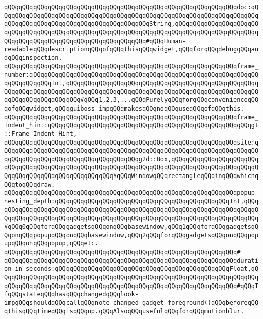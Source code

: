 \verb|qQQqqQQqqQQqqQQqqQQqqQQqqQQqqQQqqQQqqQQqqQQqqQQqqQQqqQQqqQQqqQQqdoc:qQQqqQQqqQQqqQQqqQQqqQQqqQQqqQQqqQQqqQQqqQQqqQQqqQQqqQQqqQQqqQQqqQQqqQQqqQQqqQQqqQQqqQQqqQQqqQQqqQQqqQQqqQQqqQQqString,qQQqqQQqqQQqqQQqqQQqqQQqqQQqqQQqqQQqqQQqqQQqqQQqqQQqqQQqqQQqqQQqqQQqqQQqqQQqqQQqqQQqqQQqqQQqqQQqqQQqqQQqqQQqqQQqqQQqqQQqqQQqqQQqqQQq#qQQqHuman-readableqQQqdescriptionqQQqofqQQqthisqQQqwidget,qQQqforqQQqdebugqQQqandqQQqinspection.|\newline
\verb|qQQqqQQqqQQqqQQqqQQqqQQqqQQqqQQqqQQqqQQqqQQqqQQqqQQqqQQqqQQqqQQqframe_number:qQQqqQQqqQQqqQQqqQQqqQQqqQQqqQQqqQQqqQQqqQQqqQQqqQQqqQQqqQQqqQQqqQQqqQQqqQQqInt,qQQqqQQqqQQqqQQqqQQqqQQqqQQqqQQqqQQqqQQqqQQqqQQqqQQqqQQqqQQqqQQqqQQqqQQqqQQqqQQqqQQqqQQqqQQqqQQqqQQqqQQqqQQqqQQqqQQqqQQqqQQqqQQqqQQqqQQqqQQqqQQq#qQQq1,2,3,...qQQqPurelyqQQqforqQQqconvenienceqQQqofqQQqwidget,qQQqguiboss-impqQQqmakesqQQqnoqQQquseqQQqofqQQqthis.|\newline
\verb|qQQqqQQqqQQqqQQqqQQqqQQqqQQqqQQqqQQqqQQqqQQqqQQqqQQqqQQqqQQqqQQqframe_indent_hint:qQQqqQQqqQQqqQQqqQQqqQQqqQQqqQQqqQQqqQQqqQQqqQQqqQQqqQQqgt::Frame_Indent_Hint,|\newline
\verb|qQQqqQQqqQQqqQQqqQQqqQQqqQQqqQQqqQQqqQQqqQQqqQQqqQQqqQQqqQQqqQQqsite:qQQqqQQqqQQqqQQqqQQqqQQqqQQqqQQqqQQqqQQqqQQqqQQqqQQqqQQqqQQqqQQqqQQqqQQqqQQqqQQqqQQqqQQqqQQqqQQqqQQqqQQqqQQqg2d::Box,qQQqqQQqqQQqqQQqqQQqqQQqqQQqqQQqqQQqqQQqqQQqqQQqqQQqqQQqqQQqqQQqqQQqqQQqqQQqqQQqqQQqqQQqqQQqqQQqqQQqqQQqqQQqqQQqqQQqqQQqqQQq#qQQqWindowqQQqrectangleqQQqinqQQqwhichqQQqtoqQQqdraw.|\newline
\verb|qQQqqQQqqQQqqQQqqQQqqQQqqQQqqQQqqQQqqQQqqQQqqQQqqQQqqQQqqQQqqQQqpopup_nesting_depth:qQQqqQQqqQQqqQQqqQQqqQQqqQQqqQQqqQQqqQQqqQQqqQQqInt,qQQqqQQqqQQqqQQqqQQqqQQqqQQqqQQqqQQqqQQqqQQqqQQqqQQqqQQqqQQqqQQqqQQqqQQqqQQqqQQqqQQqqQQqqQQqqQQqqQQqqQQqqQQqqQQqqQQqqQQqqQQqqQQqqQQqqQQqqQQqqQQq#qQQq0qQQqforqQQqgadgetsqQQqonqQQqbasewindow,qQQq1qQQqforqQQqgadgetsqQQqonqQQqpopupqQQqonqQQqbasewindow,qQQq2qQQqforqQQqgadgetsqQQqonqQQqpopupqQQqonqQQqpopup,qQQqetc.|\newline
\verb|qQQqqQQqqQQqqQQqqQQqqQQqqQQqqQQqqQQqqQQqqQQqqQQqqQQqqQQqqQQqqQQq#|\newline
\verb|qQQqqQQqqQQqqQQqqQQqqQQqqQQqqQQqqQQqqQQqqQQqqQQqqQQqqQQqqQQqqQQqduration_in_seconds:qQQqqQQqqQQqqQQqqQQqqQQqqQQqqQQqqQQqqQQqqQQqqQQqFloat,qQQqqQQqqQQqqQQqqQQqqQQqqQQqqQQqqQQqqQQqqQQqqQQqqQQqqQQqqQQqqQQqqQQqqQQqqQQqqQQqqQQqqQQqqQQqqQQqqQQqqQQqqQQqqQQqqQQqqQQqqQQqqQQqqQQqqQQq#qQQqIfqQQqstateqQQqhasqQQqchangedqQQqlook-impqQQqshouldqQQqcallqQQqnote_changed_gadget_foreground()qQQqbeforeqQQqthisqQQqtimeqQQqisqQQqup.qQQqAlsoqQQqusefulqQQqforqQQqmotionblur.|\newline
